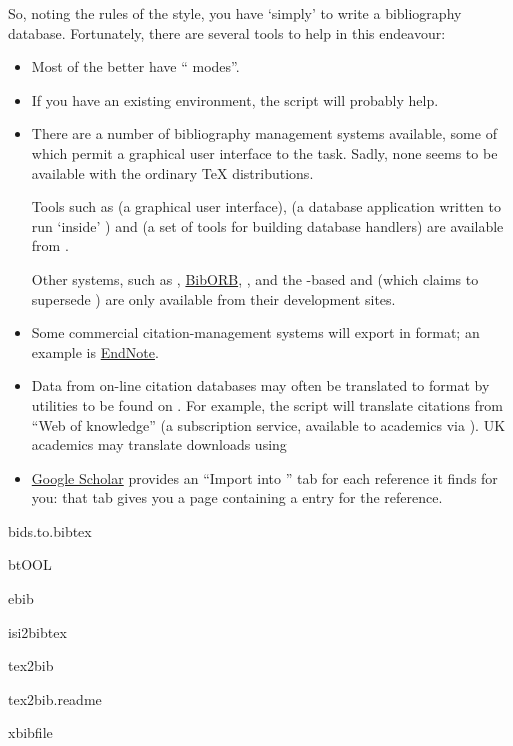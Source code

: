 So, noting the rules of the style, you have `simply' to write a
bibliography database.  Fortunately, there are several tools to help
in this endeavour:
\begin{itemize}
\item Most of the better 
  have ``\BibTeX{} modes''.
\item If you have an existing 
  environment, the  script  will
  probably help.
\item There are a number of \BibTeX{} bibliography management systems
  available, some of which permit a graphical user interface to the
  task.  Sadly, none seems to be available with the ordinary \TeX{}
  distributions.
  
  Tools such as  (a graphical user interface),
   (a database application written to run `inside'
  ) and 
   (a set of  tools for building 
  \BibTeX{} database handlers) are available from .

  Other systems, such as
  \href{http://refdb.sourceforge.net/}{},
  \href{http://www.nongnu.org/biborb}{BibORB},
  \href{http://bibdesk.sourceforge.net/}{},
  \href{http://pybliographer.org}{} and the
  -based
  \href{http://freshmeat.net/projects/bibkeeper/}{}
  and \href{http://jabref.sourceforge.net}{} (which
  claims to supersede )
  are only available from their development sites.
\item Some commercial citation-management systems will export in
  \BibTeX{} format; an example is
  \href{http://www.endnote.com/}{EndNote}.
\item Data from on-line citation databases may often be translated to
  \BibTeX{} format by utilities to be found on .  For
  example, the  script  will
  translate citations from  ``Web of knowledge'' (a
  subscription service, available to  academics via
  ).  UK academics may translate  downloads
  using 
\item \href{http://scholar.google.com}{Google Scholar} provides an
  ``Import into \BibTeX{}'' tab for each reference it finds for you:
  that tab gives you a page containing a \BibTeX{} entry for the
  reference.
\end{itemize}
\begin{ctanrefs}
\item[bids.to.bibtex]
\item[btOOL]
\item[ebib]
\item[isi2bibtex]
\item[tex2bib]
\item[tex2bib.readme]
\item[xbibfile]
\end{ctanrefs}

